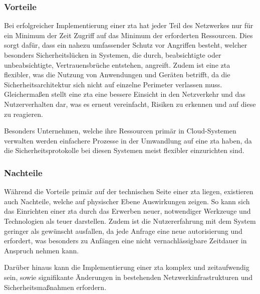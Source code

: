 \subsubsection{Vorteile}\label{subsubsec:vorteile}
Bei erfolgreicher Implementierung einer \ac{zta} hat jeder Teil des Netzwerkes nur für ein Minimum der Zeit Zugriff auf das Minimum der erforderten Ressourcen.
Dies sorgt dafür, dass ein nahezu umfassender Schutz vor Angriffen besteht, welcher besonders Sicherheitslücken in Systemen, die durch, beabsichtigte oder unbeabsichtigte, Vertrauensbrüche entstehen, angreift\autocite[\vglf][]{Edo-2022}.
Zudem ist eine \ac{zta} flexibler, was die Nutzung von Anwendungen und Geräten betrifft, da die Sicherheitsarchitektur sich nicht auf einzelne Perimeter verlassen muss.\autocites[\vglf][]{shore-2021}[\vglf][]{hunter-2020}
Gleichermaßen stellt eine \ac{zta} eine bessere Einsicht in den Netzverkehr und das Nutzerverhalten dar, was es erneut vereinfacht, Risiken zu erkennen und auf diese zu reagieren.\autocite[\vglf][]{shore-2021}

Besonders Unternehmen, welche ihre Ressourcen primär in Cloud-Systemen verwalten werden einfachere Prozesse in der Umwandlung auf eine \ac{zta} haben, da die Sicherheitsprotokolle bei diesen Systemen meist flexibler einzurichten sind.

\subsubsection{Nachteile}\label{subsubsec:nachteile}
Während die Vorteile primär auf der technischen Seite einer \ac{zta} liegen, existieren auch Nachteile, welche auf physischer Ebene Auswirkungen zeigen.
So kann sich das Einrichten einer \ac{zta} durch das Erwerben neuer, notwendiger Werkzeuge und Technologien als teuer darstellen.\autocite[\vglf][]{shore-2021}
Zudem ist die Nutzererfahrung mit dem System geringer als gewünscht ausfallen, da jede Anfrage eine neue \gls{autorisierung} und  erfordert, was besonders zu Anfängen eine nicht vernachlässigbare Zeitdauer in Anspruch nehmen kann.\autocite[\vglf][]{shore-2021}

Darüber hinaus kann die Implementierung einer \ac{zta} komplex und zeitaufwendig sein, sowie signifikante Änderungen in bestehenden Netzwerkinfrastrukturen und Sicherheitsmaßnahmen erfordern.\autocites[\vglf][]{shore-2021}[\vglf][]{buck-2021}